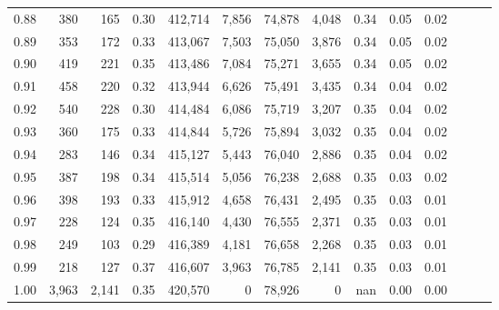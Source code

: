 \begin{tabular}{rrrrrrrrrrrrrr}
0.88 &     380 &    165 &  0.30 &  412,714 &    7,856 &  74,878 &   4,048 &  0.34 &  0.05 &      0.02 \\
0.89 &     353 &    172 &  0.33 &  413,067 &    7,503 &  75,050 &   3,876 &  0.34 &  0.05 &      0.02 \\
0.90 &     419 &    221 &  0.35 &  413,486 &    7,084 &  75,271 &   3,655 &  0.34 &  0.05 &      0.02 \\
0.91 &     458 &    220 &  0.32 &  413,944 &    6,626 &  75,491 &   3,435 &  0.34 &  0.04 &      0.02 \\
0.92 &     540 &    228 &  0.30 &  414,484 &    6,086 &  75,719 &   3,207 &  0.35 &  0.04 &      0.02 \\
0.93 &     360 &    175 &  0.33 &  414,844 &    5,726 &  75,894 &   3,032 &  0.35 &  0.04 &      0.02 \\
0.94 &     283 &    146 &  0.34 &  415,127 &    5,443 &  76,040 &   2,886 &  0.35 &  0.04 &      0.02 \\
0.95 &     387 &    198 &  0.34 &  415,514 &    5,056 &  76,238 &   2,688 &  0.35 &  0.03 &      0.02 \\
0.96 &     398 &    193 &  0.33 &  415,912 &    4,658 &  76,431 &   2,495 &  0.35 &  0.03 &      0.01 \\
0.97 &     228 &    124 &  0.35 &  416,140 &    4,430 &  76,555 &   2,371 &  0.35 &  0.03 &      0.01 \\
0.98 &     249 &    103 &  0.29 &  416,389 &    4,181 &  76,658 &   2,268 &  0.35 &  0.03 &      0.01 \\
0.99 &     218 &    127 &  0.37 &  416,607 &    3,963 &  76,785 &   2,141 &  0.35 &  0.03 &      0.01 \\
1.00 &   3,963 &  2,141 &  0.35 &  420,570 &        0 &  78,926 &       0 &   nan &  0.00 &      0.00 \\
\bottomrule
\end{tabular}
